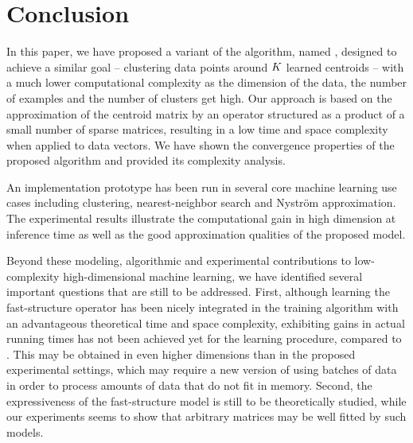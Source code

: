 \section{Conclusion}
\label{sec:conclusion}

In this paper, we have proposed a variant of the \kmeans algorithm, named \qkmeans, designed to achieve a similar goal -- clustering data points around $K$ learned centroids -- with a much lower computational complexity as the dimension of the data, the number of examples and the number of clusters get high. Our approach is based on the approximation of the centroid matrix by an operator structured as a product of a small number of sparse matrices, resulting in a low time and space complexity when applied to data vectors.
We have shown the convergence properties of the proposed algorithm and provided its complexity analysis.

An implementation prototype has been run in several core machine learning use cases including clustering, nearest-neighbor search and Nystr\"om approximation. The experimental results illustrate the computational gain in high dimension at inference time as well as the good approximation qualities of the proposed model.

Beyond these modeling, algorithmic and experimental contributions to low-complexity high-dimensional machine learning, we have identified several important questions that are still to be addressed.
First, although learning the fast-structure operator has been nicely integrated in the training algorithm with an advantageous theoretical time and space complexity, exhibiting gains in actual running times has not been achieved yet for the \qkmeans learning procedure, compared to \kmeans.
This may be obtained in even higher dimensions than in the proposed experimental settings, which may require a new version of \qkmeans using batches of data in order to process amounts of data that do not fit in memory.
Second, the expressiveness of the fast-structure model is still to be theoretically studied, while our experiments seems to show that arbitrary matrices may be well fitted by such models.


